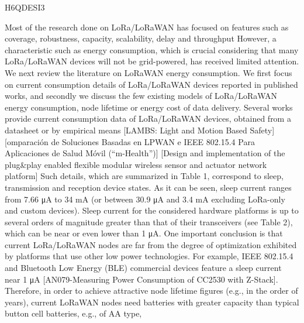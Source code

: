 \cite{casals_modeling_2017} H6QDESI3

Most of the research done on LoRa/LoRaWAN has focused on features such as coverage,
	robustness,
	capacity,
	scalability,
	delay and throughput \cite{mikhaylov_analysis_2016}
 \cite{petajajarvi_coverage_2015}
\cite{adelantado_understanding_2017}
\cite{augustin_study_2016}
\cite{nolan_evaluation_2016}
\cite{petajajarvi_performance_2017}
\cite{mikhaylov_lorawan_2017}
\cite{jetmir_haxhibeqiri_lora_2017}
\cite{petajajarvi_evaluation_2017}
However,
	a characteristic such as energy consumption,
	which is crucial considering that many LoRa/LoRaWAN devices will not be grid-powered,
	has received limited attention.
We next review the literature on LoRaWAN energy consumption.
We first focus on current consumption details of LoRa/LoRaWAN devices reported in published works,
	and secondly we discuss the few existing models of LoRa/LoRaWAN energy consumption,
	node lifetime or energy cost of data delivery.
Several works provide current consumption data of LoRa/LoRaWAN devices,
	obtained from a datasheet or by empirical means  \cite{petajajarvi_evaluation_2017}
\cite{kim_cooperative_2017}
\cite{mahmoud_study_2016}
[LAMBS: Light and Motion Based Safety] \cite{bor_lora_2017}
[omparación de Soluciones Basadas en LPWAN e IEEE 802.15.4 Para Aplicaciones de Salud Móvil (“m-Health”)] \cite{neumann_indoor_2016}
[Design and implementation of the plug\&play enabled ﬂexible modular wireless sensor and actuator network platform] \cite{magno_wulora_2017}
\cite{dongare_openchirp_2017}
\cite{conus_event-driven_2016}
Such details,
	which are summarized in Table 1,
	correspond to sleep,
	transmission and reception device states.
As it can be seen,
	sleep current ranges from 7.66 μA to 34 mA (or between 30.9 μA and 3.4 mA excluding LoRa-only and custom devices).
Sleep current for the considered hardware platforms is up to several orders of magnitude greater than that of their transceivers (see Table 2),
	which can be near or even lower than 1 μA.
One important conclusion is that current LoRa/LoRaWAN nodes are far from the degree of optimization exhibited by platforms that use other low power technologies.
For example,
	IEEE 802.15.4 and Bluetooth Low Energy (BLE) commercial devices feature a sleep current near 1 μA [AN079-Measuring Power Consumption of CC2530 with Z-Stack]\cite{aguilar_opportunistic_2017}.
Therefore,
	in order to achieve attractive node lifetime figures (e.g.,
	in the order of years),
	current LoRaWAN nodes need batteries with greater capacity than typical button cell batteries,
	e.g.,
	of AA type,
